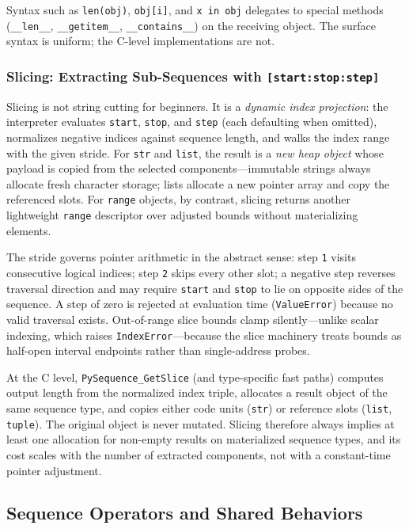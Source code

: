 \documentclass[a4paper,twoside]{report}
\begin{document}
Syntax such as \texttt{len(obj)}, \texttt{obj[i]}, and \texttt{x in obj} delegates to special methods (\texttt{\_\_len\_\_}, \texttt{\_\_getitem\_\_}, \texttt{\_\_contains\_\_}) on the receiving object. The surface syntax is uniform; the C-level implementations are not.

\subsubsection{Slicing: Extracting Sub-Sequences with \texttt{[start:stop:step]}}

Slicing is not string cutting for beginners. It is a \emph{dynamic index projection}: the interpreter evaluates \texttt{start}, \texttt{stop}, and \texttt{step} (each defaulting when omitted), normalizes negative indices against sequence length, and walks the index range with the given stride. For \texttt{str} and \texttt{list}, the result is a \emph{new heap object} whose payload is copied from the selected components---immutable strings always allocate fresh character storage; lists allocate a new pointer array and copy the referenced slots. For \texttt{range} objects, by contrast, slicing returns another lightweight \texttt{range} descriptor over adjusted bounds without materializing elements.

The stride governs pointer arithmetic in the abstract sense: step \texttt{1} visits consecutive logical indices; step \texttt{2} skips every other slot; a negative step reverses traversal direction and may require \texttt{start} and \texttt{stop} to lie on opposite sides of the sequence. A step of zero is rejected at evaluation time (\texttt{ValueError}) because no valid traversal exists. Out-of-range slice bounds clamp silently---unlike scalar indexing, which raises \texttt{IndexError}---because the slice machinery treats bounds as half-open interval endpoints rather than single-address probes.

At the C level, \texttt{PySequence\_GetSlice} (and type-specific fast paths) computes output length from the normalized index triple, allocates a result object of the same sequence type, and copies either code units (\texttt{str}) or reference slots (\texttt{list}, \texttt{tuple}). The original object is never mutated. Slicing therefore always implies at least one allocation for non-empty results on materialized sequence types, and its cost scales with the number of extracted components, not with a constant-time pointer adjustment.


\subsection{Sequence Operators and Shared Behaviors}
\end{document}
